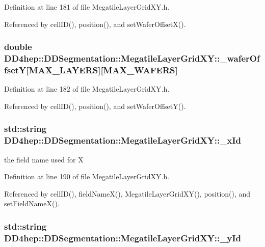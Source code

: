 Definition at line 181 of file MegatileLayerGridXY.h.

Referenced by cellID(), position(), and setWaferOffsetX().\hypertarget{class_d_d4hep_1_1_d_d_segmentation_1_1_megatile_layer_grid_x_y_aecce12c3e118e5e9176a46395938e8f8}{
\subsubsection[{\_\-waferOffsetY}]{\setlength{\rightskip}{0pt plus 5cm}double {\bf DD4hep::DDSegmentation::MegatileLayerGridXY::\_\-waferOffsetY}\mbox{[}MAX\_\-LAYERS\mbox{]}\mbox{[}MAX\_\-WAFERS\mbox{]}}}
\label{class_d_d4hep_1_1_d_d_segmentation_1_1_megatile_layer_grid_x_y_aecce12c3e118e5e9176a46395938e8f8}


Definition at line 182 of file MegatileLayerGridXY.h.

Referenced by cellID(), position(), and setWaferOffsetY().\hypertarget{class_d_d4hep_1_1_d_d_segmentation_1_1_megatile_layer_grid_x_y_a84cfbe6eadc2e1dfd01b276ec5a06cb3}{
\subsubsection[{\_\-xId}]{\setlength{\rightskip}{0pt plus 5cm}std::string {\bf DD4hep::DDSegmentation::MegatileLayerGridXY::\_\-xId}}}
\label{class_d_d4hep_1_1_d_d_segmentation_1_1_megatile_layer_grid_x_y_a84cfbe6eadc2e1dfd01b276ec5a06cb3}


the field name used for X 

Definition at line 190 of file MegatileLayerGridXY.h.

Referenced by cellID(), fieldNameX(), MegatileLayerGridXY(), position(), and setFieldNameX().\hypertarget{class_d_d4hep_1_1_d_d_segmentation_1_1_megatile_layer_grid_x_y_af0dce96a744ec959a58a8d34e3e35469}{
\subsubsection[{\_\-yId}]{\setlength{\rightskip}{0pt plus 5cm}std::string {\bf DD4hep::DDSegmentation::MegatileLayerGridXY::\_\-yId}}}
\label{class_d_d4hep_1_1_d_d_segmentation_1_1_megatile_layer_grid_x_y_af0dce96a744ec959a58a8d34e3e35469}


